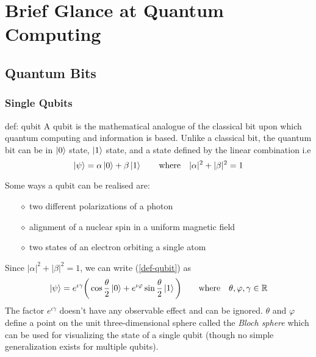 \chapter{Brief Glance at Quantum Computing}
\section{Quantum Bits}
\subsection{Single Qubits}
\begin{definition}[Qubit]{def: qubit}
    A qubit is the mathematical analogue of the classical bit upon which quantum computing and information is based. Unlike a classical bit, the quantum bit can be in $\ket{0}$ state, $\ket{1}$ state, and a state defined by the linear combination i.e 
    \begin{equation} \label{def-qubit}
     \ket{\psi} = \alpha \ket{0} + \beta \ket{1} \qquad \text{where}\quad|\alpha|^2 + |\beta|^2 = 1
     \end{equation}
\end{definition}
Some ways a qubit can be realised are:
\begin{itemize}
\item[$\diamond$] two different polarizations of a photon
\item[$\diamond$] alignment of a nuclear spin in a uniform magnetic field
\item[$\diamond$] two states of an electron orbiting a single atom
\end{itemize}
Since $|\alpha|^2 + |\beta|^2 = 1$, we can write (\ref{def-qubit}) as
\begin{equation}
    \ket{\psi} = e^{\iota\gamma}\bigg(\cos\frac{\theta}{2}\ket{0} + e^{\iota\varphi}\sin\frac{\theta}{2}\ket{1}\bigg) \qquad \text{where} \quad \theta, \varphi, \gamma \in \mathbb{R}
\end{equation}
The factor $e^{\iota\gamma}$ doesn't have any observable effect and can be ignored. $\theta$ and $\varphi$ define a point on the unit three-dimensional sphere called the \textit{Bloch sphere} which can be used for visualizing the state of a single qubit (though no simple generalization exists for multiple qubits).
